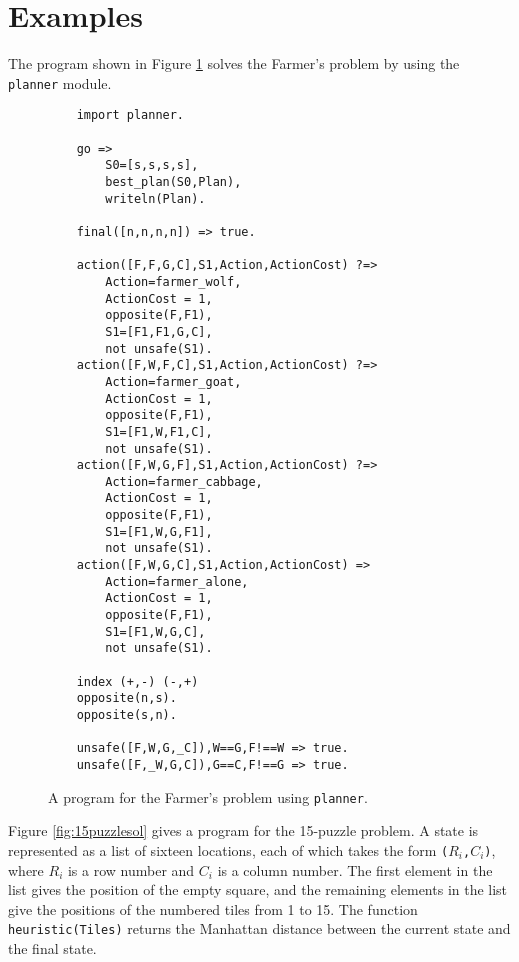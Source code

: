 \section{Examples}
The program shown in Figure \ref{fig:farmer2} solves the Farmer's problem by using the \texttt{planner} module. 

\begin{figure}
\begin{center}
\begin{verbatim}
    import planner.

    go =>
        S0=[s,s,s,s],
        best_plan(S0,Plan),
        writeln(Plan).

    final([n,n,n,n]) => true.

    action([F,F,G,C],S1,Action,ActionCost) ?=>
        Action=farmer_wolf,
        ActionCost = 1,        
        opposite(F,F1),
        S1=[F1,F1,G,C],
        not unsafe(S1).
    action([F,W,F,C],S1,Action,ActionCost) ?=>
        Action=farmer_goat,
        ActionCost = 1,        
        opposite(F,F1),
        S1=[F1,W,F1,C],
        not unsafe(S1).
    action([F,W,G,F],S1,Action,ActionCost) ?=>
        Action=farmer_cabbage,
        ActionCost = 1,        
        opposite(F,F1),
        S1=[F1,W,G,F1],
        not unsafe(S1).
    action([F,W,G,C],S1,Action,ActionCost) =>
        Action=farmer_alone,
        ActionCost = 1,        
        opposite(F,F1),
        S1=[F1,W,G,C],
        not unsafe(S1).

    index (+,-) (-,+)
    opposite(n,s).
    opposite(s,n).

    unsafe([F,W,G,_C]),W==G,F!==W => true.
    unsafe([F,_W,G,C]),G==C,F!==G => true.
\end{verbatim}
\end{center}
\caption{\label{fig:farmer2}A program for the Farmer's problem using \texttt{planner}.}
\end{figure}

Figure \ref{fig:15puzzlesol} gives a program for the 15-puzzle problem. A state is represented as a list of sixteen locations, each of which takes the form \texttt{($R_i$,$C_i$)}, where $R_i$ is a row number and $C_i$ is a column number. The first element in the list gives the position of the empty square, and the remaining elements in the list give the positions of the numbered tiles from 1 to 15. The function \texttt{heuristic(Tiles)} returns the Manhattan distance between the current state and the final state.

